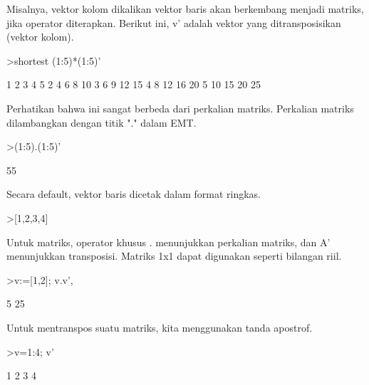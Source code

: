 \documentclass[a4paper,10pt]{article}
\begin{document}
\begin{eulernotebook}
\begin{eulercomment}
\begin{eulercomment}
\begin{eulercomment}
\begin{eulercomment}
\begin{eulercomment}
\begin{eulercomment}
\begin{eulercomment}
Misalnya, vektor kolom dikalikan vektor baris akan berkembang menjadi
matriks, jika operator diterapkan. Berikut ini, v' adalah vektor yang
ditransposisikan (vektor kolom).
\end{eulercomment}
\begin{eulerprompt}
>shortest (1:5)*(1:5)'
\end{eulerprompt}
\begin{euleroutput}
       1      2      3      4      5 
       2      4      6      8     10 
       3      6      9     12     15 
       4      8     12     16     20 
       5     10     15     20     25 
\end{euleroutput}
\begin{eulercomment}
Perhatikan bahwa ini sangat berbeda dari perkalian matriks. Perkalian
matriks dilambangkan dengan titik "." dalam EMT.
\end{eulercomment}
\begin{eulerprompt}
>(1:5).(1:5)'
\end{eulerprompt}
\begin{euleroutput}
  55
\end{euleroutput}
\begin{eulercomment}
Secara default, vektor baris dicetak dalam format ringkas.
\end{eulercomment}
\begin{eulerprompt}
>[1,2,3,4]
\end{eulerprompt}
\begin{euleroutput}
  [1,  2,  3,  4]
\end{euleroutput}
\begin{eulercomment}
Untuk matriks, operator khusus . menunjukkan perkalian matriks, dan A'
menunjukkan transposisi. Matriks 1x1 dapat digunakan seperti bilangan
riil.
\end{eulercomment}
\begin{eulerprompt}
>v:=[1,2]; v.v', %
\end{eulerprompt}
\begin{euleroutput}
  5
  25
\end{euleroutput}
\begin{eulercomment}
Untuk mentranspos suatu matriks, kita menggunakan tanda apostrof.
\end{eulercomment}
\begin{eulerprompt}
>v=1:4; v'
\end{eulerprompt}
\begin{euleroutput}
              1 
              2 
              3 
              4 
\end{euleroutput}

\end{eulercomment}
\end{eulercomment}
\end{eulercomment}
\end{eulercomment}
\end{eulercomment}
\end{eulercomment}
\end{eulernotebook}
\end{document}
